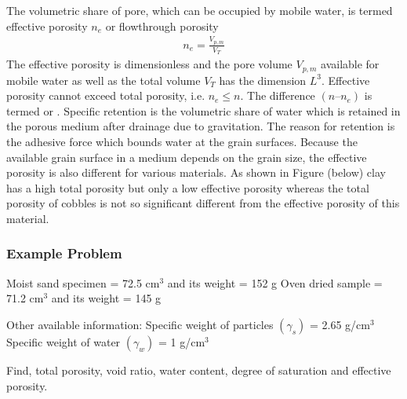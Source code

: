 \documentclass[letterpaper,10pt,english]{sphinxmanual}
\let\sphinxpxdimen\pdfpxdimen\else\newdimen\sphinxpxdimen
\begin{document}
The volumetric share of pore, which can be occupied by mobile water, is termed effective porosity \(n_e\) or flow\sphinxhyphen{}through porosity
\begin{equation*}
\begin{split}
n_e = \frac{V_{p, m}}{V_T}
\end{split}
\end{equation*}
The effective porosity is dimensionless and the pore volume \(V_{p,m}\) available for mobile water as well as the total volume \(V_T\) has the dimension \(L^3\). Effective porosity cannot exceed total porosity, i.e. \(n_e \leq n\). The difference \((n – n_e)\) is termed  or . Specific retention is the volumetric share of water which is retained in the porous medium after drainage due to gravitation.  The reason for retention is the adhesive force which bounds water at the grain surfaces. Because the available grain surface in a medium depends on the grain size, the effective porosity is also different for various materials. As shown in Figure (below) clay has a high total porosity but only a low effective porosity whereas the total porosity of cobbles is not so significant different from the effective porosity of this material.

\noindent\sphinxincludegraphics[width=400\sphinxpxdimen]{{L03_f_5}.png}


\subsubsection{Example Problem}
\label{\detokenize{contents/flow/lecture_03/13_gw_storage:example-problem}}
Moist sand specimen = 72.5 cm\(^3\) and its weight = 152 g
Oven dried sample = 71.2 cm\(^3\) and its weight = 145 g

Other available information:
Specific weight of particles \((\gamma_s)\) = 2.65 g/cm\(^3\)
Specific weight of water \((\gamma_w)\) = 1 g/cm\(^3\)

Find, total porosity, void ratio, water content, degree of saturation and effective porosity.
\end{document}
